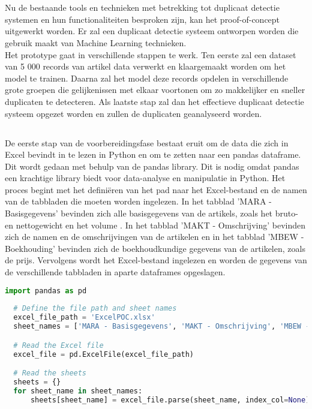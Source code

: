 
\chapter{}%
\label{ch:ProofOfConcept}

Nu de bestaande tools en technieken met betrekking tot duplicaat detectie systemen en hun functionaliteiten besproken zijn, kan het proof-of-concept uitgewerkt worden. Er zal een duplicaat detectie systeem ontworpen worden die gebruik maakt van Machine Learning technieken.
\\Het prototype gaat in verschillende stappen te werk. Ten eerste zal een dataset van 5 000 records van artikel data verwerkt en klaargemaakt worden om het model te trainen. Daarna zal het model deze records opdelen in verschillende grote groepen die gelijkenissen met elkaar voortonen om zo makkelijker en sneller duplicaten te detecteren. Als laatste stap zal dan het effectieve duplicaat detectie systeem opgezet worden en zullen de duplicaten geanalyseerd worden.

\section{}%
\label{sec:dataPreparatiePOC}

De eerste stap van de voorbereidingsfase bestaat eruit om de data die zich in Excel bevindt in te lezen in Python en om te zetten naar een pandas dataframe. Dit wordt gedaan met behulp van de pandas library. Dit is nodig omdat pandas een krachtige library biedt voor data-analyse en manipulatie in Python. Het proces begint met het definiëren van het pad naar het Excel-bestand en de namen van de tabbladen die moeten worden ingelezen. In het tabblad 'MARA - Basisgegevens' bevinden zich alle basisgegevens van de artikels, zoals het bruto- en nettogewicht en het volume . In het tabblad 'MAKT - Omschrijving' bevinden zich de namen en de omschrijvingen van de artikelen en in het tabblad 'MBEW - Boekhouding' bevinden zich de boekhoudkundige gegevens van de artikelen, zoals de prijs. Vervolgens wordt het Excel-bestand ingelezen en worden de gegevens van de verschillende tabbladen in aparte dataframes opgeslagen.
\begin{lstlisting}[language=Python, caption={Het inlezen van Excel-gegevens in een pandas dataframe}]
  import pandas as pd
  
  # Define the file path and sheet names
  excel_file_path = 'ExcelPOC.xlsx'
  sheet_names = ['MARA - Basisgegevens', 'MAKT - Omschrijving', 'MBEW - Boekhouding']

  # Read the Excel file
  excel_file = pd.ExcelFile(excel_file_path)

  # Read the sheets
  sheets = {}
  for sheet_name in sheet_names:
      sheets[sheet_name] = excel_file.parse(sheet_name, index_col=None)
\end{lstlisting}

